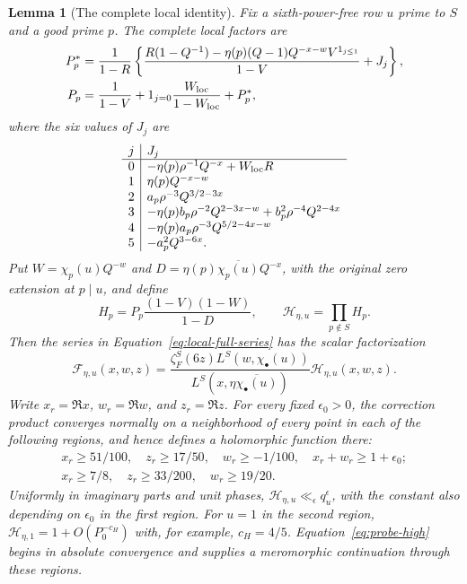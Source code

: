 \documentclass[12pt]{article}
\newtheorem{lemma}[theorem]{Lemma}
\begin{document}
\begin{lemma}[The complete local identity]\label{lem:local-euler}
Fix a sixth-power-free row $u$ prime to $S$ and a good prime $p$.
The complete local factors are
\begin{equation}\label{old-eq:5.13a}
\begin{aligned}
 P_p^*&=\frac1{1-R}\left\{
 \frac{R(1-Q^{-1})-\eta(p)(Q-1)
 Q^{-x-w}V^{1_{j\le1}}}{1-V}+J_j\right\},\\
 P_p&=\frac1{1-V}+1_{j=0}\frac{W_{\rm loc}}{1-W_{\rm loc}}+P_p^*,
\end{aligned}
\end{equation}
where the six values of $J_j$ are
\[
\begin{array}{c|l}
 j&J_j\\\hline
 0&-\eta(p)\rho^{-1}Q^{-x}+W_{\rm loc}R\\
 1&\eta(p)Q^{-x-w}\\
 2&a_p\rho^{-3}Q^{3/2-3x}\\
 3&-\eta(p)b_p\rho^{-2}Q^{2-3x-w}
       +b_p^2\rho^{-4}Q^{2-4x}\\
 4&-\eta(p)a_p\rho^{-3}Q^{5/2-4x-w}\\
 5&-a_p^2Q^{3-6x}.
\end{array}
\]
Put $W=\chi_p(u)Q^{-w}$ and
$D=\eta(p)\overline{\chi_p(u)}Q^{-x}$, with the original zero
extension at $p\mid u$, and define
\begin{equation}\label{eq:local-H-definition}
 H_p=P_p\frac{(1-V)(1-W)}{1-D},\qquad
 \mathcal H_{\eta,u}=\prod_{p\notin S}H_p.
\end{equation}
Then the series in Equation~\eqref{eq:local-full-series} has the
scalar factorization
\begin{equation}\label{eq:probe-high}
 \mathcal F_{\eta,u}(x,w,z)=
 \frac{\zeta_F^S(6z)L^S(w,\chi_\bullet(u))}
 {L^S(x,\eta\overline{\chi_\bullet(u)})}
 \mathcal H_{\eta,u}(x,w,z).
\end{equation}
Write $x_r=\Re x$, $w_r=\Re w$, and $z_r=\Re z$.  For every
fixed $\epsilon_0>0$, the correction product converges normally
on a neighborhood of every point in each of the following regions,
and hence defines a holomorphic function there:
\begin{align}
 x_r\ge51/100,\quad z_r\ge17/50,\quad w_r\ge-1/100,\quad
 x_r+w_r\ge1+\epsilon_0;\label{eq:local-region-one}\\
 x_r\ge7/8,\quad z_r\ge33/200,\quad w_r\ge19/20.
 \label{eq:local-region-two}
\end{align}
Uniformly in imaginary parts and unit phases,
$\mathcal H_{\eta,u}\ll_\epsilon q_u^\epsilon$, with the constant
also depending on $\epsilon_0$ in the first region.  For $u=1$ in the
second region,
$\mathcal H_{\eta,1}=1+O(P_0^{-c_H})$ with, for example,
$c_H=4/5$.  Equation~\eqref{eq:probe-high} begins in absolute
convergence and supplies a meromorphic continuation through these
regions.
\end{lemma}
\end{document}
